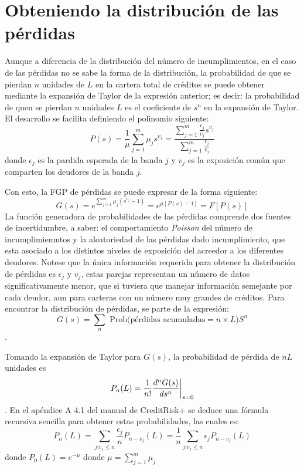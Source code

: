 \documentclass[
  12pt,
]{krantz}
\theoremstyle{definition}
\theoremstyle{definition}
\theoremstyle{definition}
\theoremstyle{remark}
\begin{document}
\hypertarget{obteniendo-la-distribucion-de-las-perdidas}{%
\section{Obteniendo la distribución de las pérdidas}\label{obteniendo-la-distribucion-de-las-perdidas}}

Aunque a diferencia de la distribución del número de incumplimientos, en el caso de las pérdidas no se sabe la forma de la distribución, la probabilidad de que se pierdan \(n\) unidades de \(L\) en la cartera total de créditos se puede obtener mediante la expansión de Taylor de la expresión anterior; es decir: la probabilidad de quen se pierdan \(n\) unidades \(L\) es el coeficiente de \(s^n\) en la expansión de Taylor. El desarrollo se facilita definiendo el polinomio siguiente:\[P(s)=\frac{1}{\mu}\sum_{j=1}^m\mu_js^{v_j}=\frac{\sum_{j=1}^m\frac{\epsilon_j}{{v_j}}s^{v_j}}{\sum_{j=1}^m\frac{\epsilon_j}{{v_j}}}\] donde \(\epsilon_j\) es la pardida esperada de la banda \(j\) y \(v_j\) es la exposición común que comparten los deudores de la banda \(j\).

Con esto, la FGP de pérdidas se puede expresar de la forma siguiente:\[G(s)=e^{\sum_{j=1}^m\mu_j(s^{v_j}-1)}=e^{\mu[P(s)-1]}=F[P(s)]\]
La función generadora de probabilidades de las pérdidas comprende dos fuentes de incertidumbre, a saber: el comportamiento \emph{Poisson} del número de incumplimiemntos y la aleatoriedad de las pérdidas dado incumplimiento, que esta asociado a los distintos niveles de exposición del acreedor a los diferentes deudores. Notese que la única información requerida para obtener la distribución de pérdidas es \(\epsilon_j\) y \(v_j\), estas parejas representan un número de datos significativamente menor, que si tuviera que manejar información semejante por cada deudor, aun para carteras con un número muy grandes de créditos.
Para encontrar la distribución de pérdidas, se parte de la expresión:\[G(s)=\sum_n\textrm{ Prob(pérdidas acumuladas}=n\times L)S^n \].

Tomando la expansión de Taylor para \(G(s)\), la probabilidad de pérdida de \(nL\) unidades es\[P_n(L)=\frac{1}{n!}\frac{d^nG(s)}{ds^n}\bigg{|}_{s=0}\]. En el apéndice A 4.1 del manual de CreditRisk+ se deduce una fórmula recursiva sencilla para obtener estas probabilidades, las cuales es:\[P_n(L)=\sum_{j|v_j\le n}\frac{\epsilon_j}{n}P_{n-v_j}(L)=\frac{1}{n}\sum_{j|v_j\le n}\epsilon_jP_{n-v_j}(L)\]
donde \(P_0(L)=e^{-\mu}\) donde \(\mu=\sum_{j=1}^m\mu_j\)
\end{document}
